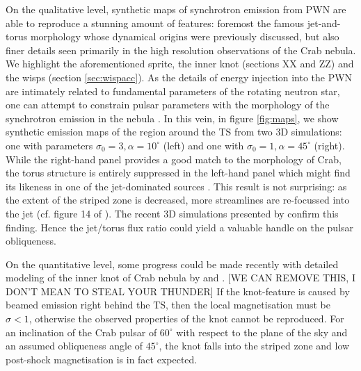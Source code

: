 On the qualitative level, synthetic maps of synchrotron emission from PWN are able to reproduce a stunning amount of features: foremost the famous jet-and-torus morphology whose dynamical origins were previously discussed, but also finer details seen primarily in the high resolution observations of the Crab nebula.  We highlight the aforementioned sprite, the inner knot {\cred (sections XX and ZZ)} and the wisps (section \ref{sec:wispacc}).
As the details of energy injection into the PWN are intimately related to fundamental parameters of the rotating neutron star, one can attempt to constrain pulsar parameters with the morphology of the synchrotron emission in the nebula \citep[e.g.][]{BuhlerGiomi2016}.  
In this vein, in figure \ref{fig:maps}, we show synthetic emission maps of the region around the TS from two 3D simulations: one with parameters $\sigma_0=3,\alpha=10^\circ$ (left) and one with $\sigma_0=1,\alpha=45^\circ$ (right).  While the right-hand panel provides a good match to the morphology of Crab, the torus structure is entirely suppressed in the left-hand panel which might find its likeness in one of the jet-dominated sources \citep[][]{KargaltsevPavlov2008}.  This result is not surprising: as the extent of the striped zone is decreased, more streamlines are re-focussed into the jet (cf. figure 14 of \cite{PorthKomissarov2014a}).  The recent 3D simulations presented by \cite{Olmi2016} confirm this finding.  Hence the jet/torus flux ratio could yield a valuable handle on the pulsar obliqueness.  

On the quantitative level, some progress could be made recently with detailed modeling of the inner knot of Crab nebula by \cite{YuanBlandford2015} and \cite{LyutikovKomissarov2016}.  [WE CAN REMOVE THIS, I DON'T MEAN TO STEAL YOUR THUNDER]  If the knot-feature is caused by beamed emission right behind the TS, then the local magnetisation must be $\sigma<1$, otherwise the observed properties of the knot cannot be reproduced.  For an inclination of the Crab pulsar of $60^\circ$ with respect to the plane of the sky and an assumed obliqueness angle of $45^\circ$, the knot falls into the striped zone and low post-shock magnetisation is in fact expected.  


